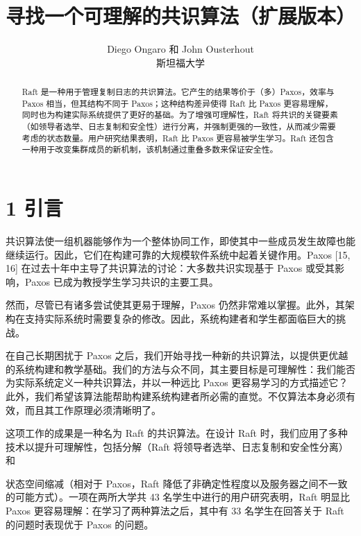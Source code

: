 \documentclass[12pt,a4paper]{report} %
\begin{document}
\title{寻找一个可理解的共识算法（扩展版本）}

\author{Diego Ongaro 和 John Ousterhout \\ 斯坦福大学}

\maketitle
\begin{abstract}

Raft 是一种用于管理复制日志的共识算法。它产生的结果等价于（多）Paxos，效率与 Paxos 相当，但其结构不同于 Paxos；这种结构差异使得 Raft 比 Paxos 更容易理解，同时也为构建实际系统提供了更好的基础。为了增强可理解性，Raft 将共识的关键要素（如领导者选举、日志复制和安全性）进行分离，并强制更强的一致性，从而减少需要考虑的状态数量。用户研究结果表明，Raft 比 Paxos 更容易被学生学习。Raft 还包含一种用于改变集群成员的新机制，该机制通过重叠多数来保证安全性。\end{abstract}

\section*{1 引言}

共识算法使一组机器能够作为一个整体协同工作，即使其中一些成员发生故障也能继续运行。因此，它们在构建可靠的大规模软件系统中起着关键作用。Paxos [15, 16] 在过去十年中主导了共识算法的讨论：大多数共识实现基于 Paxos 或受其影响，Paxos 已成为教授学生学习共识的主要工具。

然而，尽管已有诸多尝试使其更易于理解，Paxos 仍然非常难以掌握。此外，其架构在支持实际系统时需要复杂的修改。因此，系统构建者和学生都面临巨大的挑战。

在自己长期困扰于 Paxos 之后，我们开始寻找一种新的共识算法，以提供更优越的系统构建和教学基础。我们的方法与众不同，其主要目标是可理解性：我们能否为实际系统定义一种共识算法，并以一种远比 Paxos 更容易学习的方式描述它？此外，我们希望该算法能帮助构建系统构建者所必需的直觉。不仅算法本身必须有效，而且其工作原理必须清晰明了。

这项工作的成果是一种名为 Raft 的共识算法。在设计 Raft 时，我们应用了多种技术以提升可理解性，包括分解（Raft 将领导者选举、日志复制和安全性分离）和


状态空间缩减（相对于 Paxos，Raft 降低了非确定性程度以及服务器之间不一致的可能方式）。一项在两所大学共 43 名学生中进行的用户研究表明，Raft 明显比 Paxos 更容易理解：在学习了两种算法之后，其中有 33 名学生在回答关于 Raft 的问题时表现优于 Paxos 的问题。
\end{document}
